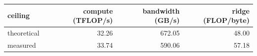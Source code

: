\begin{tabular}{lrrr}
\toprule
ceiling & compute (TFLOP/s) & bandwidth (GB/s) & ridge (FLOP/byte) \\
\midrule
theoretical & 32.26 & 672.05 & 48.00 \\
measured & 33.74 & 590.06 & 57.18 \\
\bottomrule
\end{tabular}
